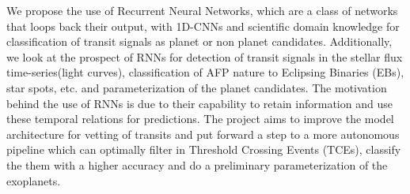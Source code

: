 We propose the use of Recurrent Neural Networks, which are a class of networks that loops back their output, with 1D-CNNs and scientific domain knowledge for classification of transit signals as planet or non planet candidates. Additionally, we look at the prospect of RNNs for detection of transit signals in the stellar flux time-series(light curves), classification of AFP nature to Eclipsing Binaries (EBs), star spots, etc. and parameterization of the planet candidates. The motivation behind the use of RNNs is due to their capability to retain information and use these temporal relations for predictions. The project aims to improve the model architecture for vetting of transits and put forward a step to a more autonomous pipeline which can optimally filter in Threshold Crossing Events (TCEs), classify the them with a higher accuracy and do a preliminary parameterization of the exoplanets.\\